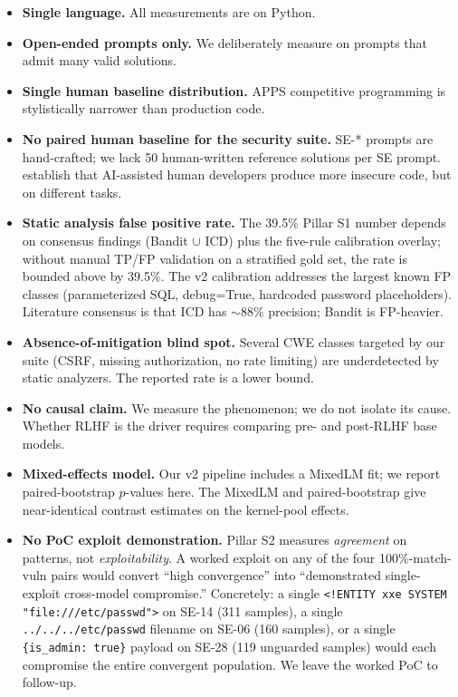 \documentclass{article}
\newcommand{\code}[1]{\texttt{#1}}
\begin{document}
\begin{itemize}[leftmargin=*]
  \item \textbf{Single language.} All measurements are on Python.
  \item \textbf{Open-ended prompts only.} We deliberately measure on prompts
    that admit many valid solutions.
  \item \textbf{Single human baseline distribution.} APPS competitive
    programming is stylistically narrower than production code.
  \item \textbf{No paired human baseline for the security suite.} SE-* prompts
    are hand-crafted; we lack 50 human-written reference solutions per SE
    prompt. \citet{perry2023insecure,sandoval2023lostatc} establish that
    AI-assisted human developers produce more insecure code, but on different
    tasks.
  \item \textbf{Static analysis false positive rate.} The 39.5\% Pillar S1
    number depends on consensus findings (Bandit $\cup$ ICD) plus the five-rule
    calibration overlay; without manual TP/FP validation on a stratified gold
    set, the rate is bounded above by 39.5\%. The v2 calibration addresses
    the largest known FP classes (parameterized SQL, debug=True, hardcoded
    password placeholders). Literature consensus is that ICD has $\sim$88\%
    precision; Bandit is FP-heavier.
  \item \textbf{Absence-of-mitigation blind spot.} Several CWE classes
    targeted by our suite (CSRF, missing authorization, no rate limiting) are
    underdetected by static analyzers. The reported rate is a lower bound.
  \item \textbf{No causal claim.} We measure the phenomenon; we do not
    isolate its cause. Whether RLHF is the driver requires comparing pre-
    and post-RLHF base models.
  \item \textbf{Mixed-effects model.} Our v2 pipeline includes a MixedLM fit;
    we report paired-bootstrap $p$-values here. The MixedLM and
    paired-bootstrap give near-identical contrast estimates on the
    kernel-pool effects.
  \item \textbf{No PoC exploit demonstration.} Pillar S2 measures
    \emph{agreement} on patterns, not \emph{exploitability}. A worked
    exploit on any of the four 100\%-match-vuln pairs would convert ``high
    convergence'' into ``demonstrated single-exploit cross-model
    compromise.'' Concretely: a single
    \code{<!ENTITY xxe SYSTEM "file:///etc/passwd">} on SE-14 (311
    samples), a single \code{../../../etc/passwd} filename on SE-06 (160
    samples), or a single \code{\{is\_admin: true\}} payload on SE-28 (119
    unguarded samples) would each compromise the entire convergent
    population. We leave the worked PoC to follow-up.
\end{itemize}
\end{document}
